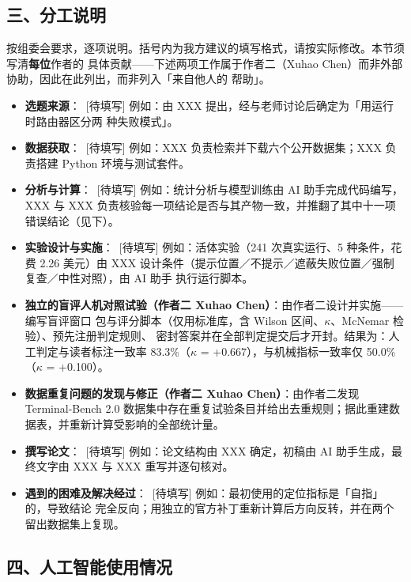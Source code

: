 \subsection*{三、分工说明}

按组委会要求，逐项说明。括号内为我方建议的填写格式，请按实际修改。本节须写清\textbf{每位}作者的
具体贡献——下述两项工作属于作者二（Xuhao Chen）而非外部协助，因此在此列出，而非列入「来自他人的
帮助」。

\begin{itemize}[leftmargin=1.3em,itemsep=2pt]
  \item \textbf{选题来源}：\ [待填写] 例如：由 XXX 提出，经与老师讨论后确定为「用运行时路由器区分两
        种失败模式」。
  \item \textbf{数据获取}：\ [待填写] 例如：XXX 负责检索并下载六个公开数据集；XXX 负责搭建
        Python 环境与测试套件。
  \item \textbf{分析与计算}：\ [待填写] 例如：统计分析与模型训练由 AI 助手完成代码编写，XXX 与
        XXX 负责核验每一项结论是否与其产物一致，并推翻了其中十一项错误结论（见下）。
  \item \textbf{实验设计与实施}：\ [待填写] 例如：活体实验（241 次真实运行、5 种条件，花费 2.26
        美元）由 XXX 设计条件（提示位置／不提示／遮蔽失败位置／强制复查／中性对照），由 AI 助手
        执行运行脚本。
  \item \textbf{独立的盲评人机对照试验（作者二 Xuhao Chen）}：由作者二设计并实施——编写盲评窗口
        包与评分脚本（仅用标准库，含 Wilson 区间、$\kappa$、McNemar 检验）、预先注册判定规则、
        密封答案并在全部判定提交后才开封。结果为：人工判定与读者标注一致率 83.3\%（$\kappa$ =
        +0.667），与机械指标一致率仅 50.0\%（$\kappa$ = +0.100）。
  \item \textbf{数据重复问题的发现与修正（作者二 Xuhao Chen）}：由作者二发现 Terminal-Bench 2.0
        数据集中存在重复试验条目并给出去重规则；据此重建数据表，并重新计算受影响的全部统计量。
  \item \textbf{撰写论文}：\ [待填写] 例如：论文结构由 XXX 确定，初稿由 AI 助手生成，最终文字由
        XXX 与 XXX 重写并逐句核对。
  \item \textbf{遇到的困难及解决经过}：\ [待填写] 例如：最初使用的定位指标是「自指」的，导致结论
        完全反向；用独立的官方补丁重新计算后方向反转，并在两个留出数据集上复现。
\end{itemize}

\subsection*{四、人工智能使用情况}

